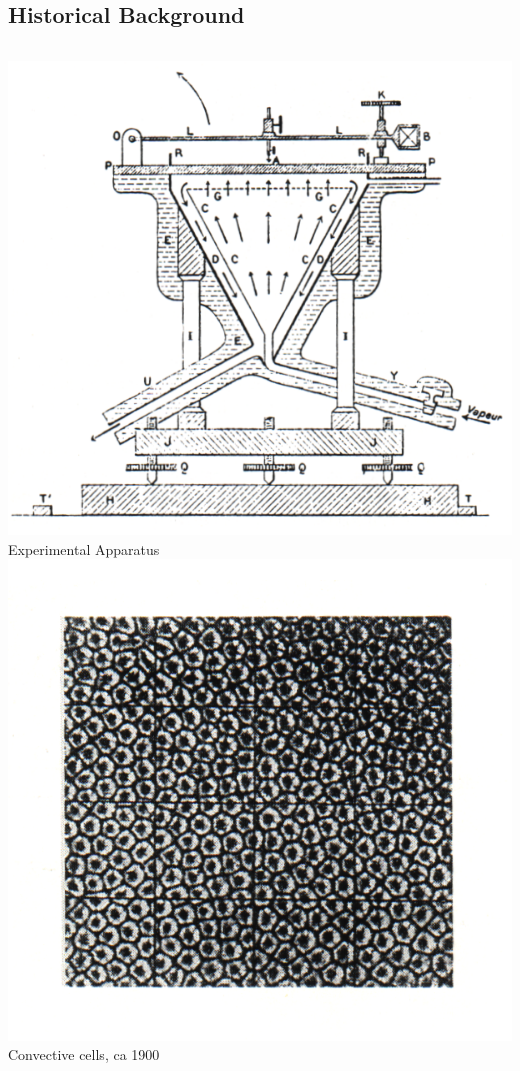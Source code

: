 \documentclass[compress,12pt]{beamer}
\begin{document}
\subsection{Historical Background}
\begin{frame}
  \begin{columns}
    \includegraphics[width=\textwidth]{figures/benards_apparatus}\\
    Experimental Apparatus
    \includegraphics[width=\textwidth]{figures/benards_result}\\
    Convective cells, ca 1900
  \end{columns}


\end{frame}
\end{document}
